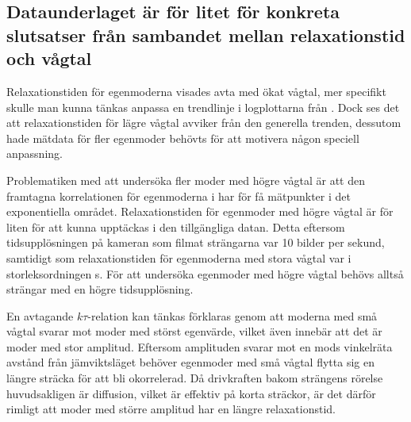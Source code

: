 

\subsection{Dataunderlaget är för litet för konkreta slutsatser från sambandet mellan relaxationstid och vågtal}
Relaxationstiden för egenmoderna visades avta med ökat vågtal, mer specifikt skulle man kunna tänkas anpassa en trendlinje i logplottarna från . Dock ses det att relaxationstiden för lägre vågtal avviker från den generella trenden, dessutom hade mätdata för fler egenmoder behövts för att motivera någon speciell anpassning. 

Problematiken med att undersöka fler moder med högre vågtal är att den framtagna korrelationen för egenmoderna i  har för få mätpunkter i det exponentiella området. Relaxationstiden för egenmoder med högre vågtal är för liten för att kunna upptäckas i den tillgängliga datan. Detta eftersom tidsupplösningen på kameran som filmat strängarna var 10 bilder per sekund, samtidigt som relaxationstiden för egenmoderna med stora vågtal var i storleksordningen \unit[0,1]{s}. För att undersöka egenmoder med högre vågtal behövs alltså strängar med en högre tidsupplösning.

En avtagande $k\tau$-relation kan tänkas förklaras genom att moderna med små vågtal svarar mot moder med störst egenvärde, vilket även innebär att det är moder med stor amplitud. Eftersom amplituden svarar mot en mods vinkelräta avstånd från jämviktsläget behöver egenmoder med små vågtal flytta sig en längre sträcka för att bli okorrelerad. Då drivkraften bakom strängens rörelse huvudsakligen är diffusion, vilket är effektiv på korta sträckor, är det därför rimligt att moder med större amplitud har en längre relaxationstid.



